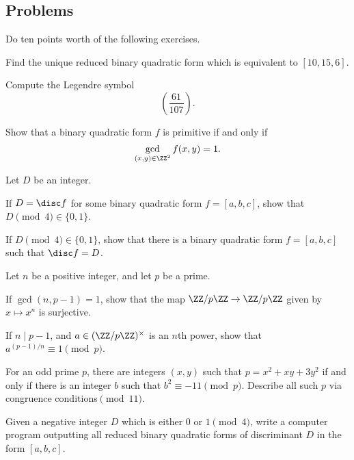 \documentclass[../notes.tex]{subfiles}
\begin{document}
\subsection{Problems}
Do ten points worth of the following exercises.
\begin{prob}[1 point]
	Find the unique reduced binary quadratic form which is equivalent to $[10,15,6]$.
\end{prob}
\begin{prob}[1 point]
	Compute the Legendre symbol
	\[\left(\frac{61}{107}\right).\]
\end{prob}
\begin{prob}[2 points] \label{prob:more-intinsic-primitive}
	Show that a binary quadratic form $f$ is primitive if and only if
	\[\gcd_{(x,y)\in\ZZ^2}f(x,y)=1.\]
\end{prob}
\begin{prob}[2 points]
	Let $D$ be an integer.
	\begin{listalph}
		\item If $D=\disc f$ for some binary quadratic form $f=[a,b,c]$, show that $D\pmod4\in\{0,1\}$.
		\item If $D\pmod4\in\{0,1\}$, show that there is a binary quadratic form $f=[a,b,c]$ such that $\disc f=D$.
	\end{listalph}
\end{prob}
\begin{prob}[3 points]
	Let $n$ be a positive integer, and let $p$ be a prime.
	\begin{listalph}
		\item If $\gcd(n,p-1)=1$, show that the map $\ZZ/p\ZZ\to\ZZ/p\ZZ$ given by $x\mapsto x^n$ is surjective.
		\item If $n\mid p-1$, and $a\in(\ZZ/p\ZZ)^\times$ is an $n$th power, show that $a^{(p-1)/n}\equiv1\pmod p$.
	\end{listalph}
\end{prob}
\begin{prob}[4 points]
	For an odd prime $p$, there are integers $(x,y)$ such that $p=x^2+xy+3y^2$ if and only if there is an integer $b$ such that $b^2\equiv-11\pmod p$. Describe all such $p$ via congruence conditions$\pmod{11}$.
\end{prob}
\begin{prob}[5 points]
	Given a negative integer $D$ which is either $0$ or $1\pmod4$, write a computer program outputting all reduced binary quadratic forms of discriminant $D$ in the form $[a,b,c]$.
\end{prob}
\end{document}
